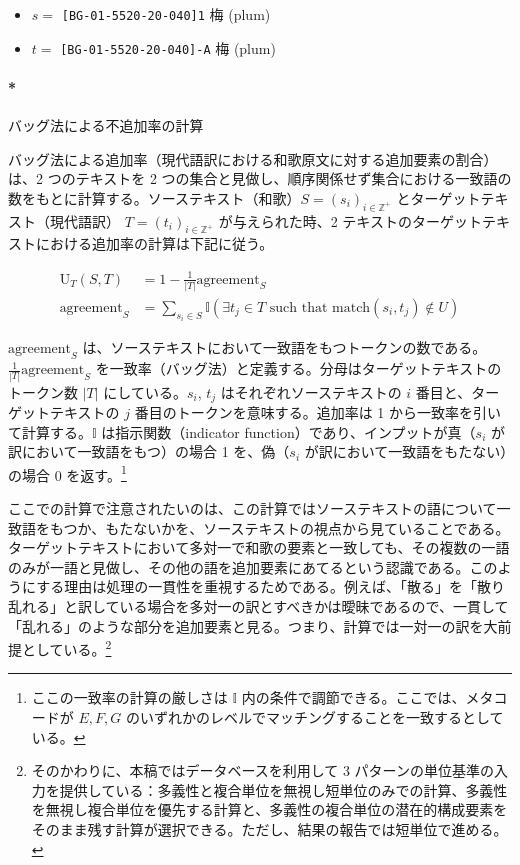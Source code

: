 \documentclass[
  letterpaper,
  DIV=11,
  numbers=noendperiod]{scrartcl}
\let\oldparagraph\paragraph
\renewcommand{\paragraph}[1]{\oldparagraph{#1}\mbox{}}
\providecommand{\tightlist}{%
  \setlength{\itemsep}{0pt}\setlength{\parskip}{0pt}}\usepackage{longtable,booktabs,array}
\begin{document}
\begin{itemize}
\tightlist
\item
  \(s=\) \texttt{{[}BG-01-5520-20-040{]}1} 梅 (plum)
\item
  \(t=\) \texttt{{[}BG-01-5520-20-040{]}-A} 梅 (plum)
\end{itemize}

\paragraph*{バッグ法による不追加率の計算}\label{ux30d0ux30c3ux30b0ux6cd5ux306bux3088ux308bux4e0dux8ffdux52a0ux7387ux306eux8a08ux7b97}

バッグ法による追加率（現代語訳における和歌原文に対する追加要素の割合）は、2
つのテキストを 2
つの集合と見做し、順序関係せず集合における一致語の数をもとに計算する。ソーステキスト（和歌）\(S=(s_i)_{i \in \mathbb{Z}^{+}}\)
とターゲットテキスト（現代語訳） \(T=(t_i)_{i \in \mathbb{Z}^{+}}\)
が与えられた時、2
テキストのターゲットテキストにおける追加率の計算は下記に従う。

\[
\begin{align}
\text{U}_{T}(S,T) &= 1 - \frac{1}{|T|}\text{agreement}_{S}\\
\text{agreement}_{S} &= \sum_{s_i \in S} \mathbb{I} \left( \exists t_j \in T \text{ such that } \text{match}(s_i, t_j) \notin U \right)
\end{align}
\]

\(\text{agreement}_{S}\)
は、ソーステキストにおいて一致語をもつトークンの数である。\(\frac{1}{|T|}\text{agreement}_{S}\)
を一致率（バッグ法）と定義する。分母はターゲットテキストのトークン数
\(|T|\) にしている。\(s_i\), \(t_j\) はそれぞれソーステキストの \(i\)
番目と、ターゲットテキストの \(j\) 番目のトークンを意味する。追加率は 1
から一致率を引いて計算する。\(\mathbb{I}\) は指示関数（indicator
function）であり、インプットが真（\(s_i\)
が訳において一致語をもつ）の場合 1 を、偽（\(s_i\)
が訳において一致語をもたない）の場合 0 を返す。\footnote{ここの一致率の計算の厳しさは
  \(\mathbb{I}\) 内の条件で調節できる。ここでは、メタコードが
  \(E, F, G\)
  のいずれかのレベルでマッチングすることを一致するとしている。}

ここでの計算で注意されたいのは、この計算ではソーステキストの語について一致語をもつか、もたないかを、ソーステキストの視点から見ていることである。ターゲットテキストにおいて多対一で和歌の要素と一致しても、その複数の一語のみが一語と見做し、その他の語を追加要素にあてるという認識である。このようにする理由は処理の一貫性を重視するためである。例えば、「散る」を「散り乱れる」と訳している場合を多対一の訳とすべきかは曖昧であるので、一貫して「乱れる」のような部分を追加要素と見る。つまり、計算では一対一の訳を大前提としている。\footnote{そのかわりに、本稿ではデータベースを利用して
  3
  パターンの単位基準の入力を提供している：多義性と複合単位を無視し短単位のみでの計算、多義性を無視し複合単位を優先する計算と、多義性の複合単位の潜在的構成要素をそのまま残す計算が選択できる。ただし、結果の報告では短単位で進める。}
\end{document}
